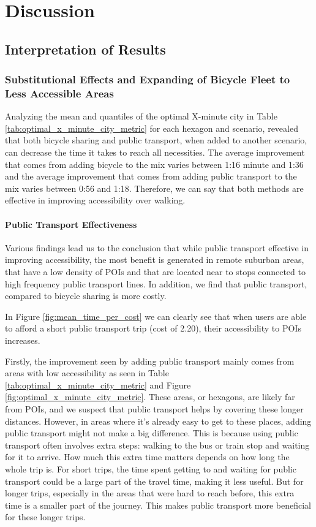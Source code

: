 \clearpage
\section{Discussion}
\label{sec:discussion}

\subsection{Interpretation of Results}
\subsubsection{Substitutional Effects and Expanding of Bicycle Fleet to Less Accessible Areas}

Analyzing the mean and quantiles of the optimal X-minute city in Table \ref{tab:optimal_x_minute_city_metric} for each hexagon and scenario, revealed that both bicycle sharing and public transport, when added to another scenario, can decrease the time it takes to reach all necessities.
The average improvement that comes from adding bicycle to the mix varies between 1:16 minute and 1:36 and the average improvement that comes from adding public transport to the mix varies between 0:56 and 1:18.
Therefore, we can say that both methods are effective in improving accessibility over walking.


\paragraph{Public Transport Effectiveness}
Various findings lead us to the conclusion that while public transport effective in improving accessibility, the most benefit is generated in remote suburban areas, that have a low density of POIs and that are located near to stops connected to high frequency public transport lines.
In addition, we find that public transport, compared to bicycle sharing is more costly.


In Figure \ref{fig:mean_time_per_cost} we can clearly see that when users are able to afford a short public transport trip (cost of 2.20), their accessibility to POIs increases.


Firstly, the improvement seen by adding public transport mainly comes from areas with low accessibility as seen in Table \ref{tab:optimal_x_minute_city_metric} and Figure \ref{fig:optimal_x_minute_city_metric}.
These areas, or hexagons, are likely far from POIs, and we suspect that  public transport helps by covering these longer distances. 
However, in areas where it's already easy to get to these places, adding public transport might not make a big difference. 
This is because using public transport often involves extra steps: walking to the bus or train stop and waiting for it to arrive. 
How much this extra time matters depends on how long the whole trip is.
For short trips, the time spent getting to and waiting for public transport could be a large part of the travel time, making it less useful. 
But for longer trips, especially in the areas that were hard to reach before, this extra time is a smaller part of the journey. 
This makes public transport more beneficial for these longer trips. 

